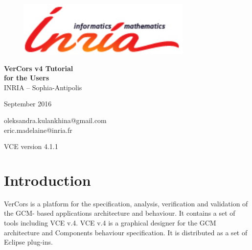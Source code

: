 \documentclass[12pt]{article}
\begin{document}
\begin{titlepage}

\begin{figure}[t]
    \centering
    \includegraphics[scale=0.4]{./draws/inria-logo.png}
\end{figure}

\vspace*{2cm}
\begin{center}
	{\huge \textbf{VerCors v4 Tutorial }} \vspace*{0.5cm}
\\
{\huge \textbf{for the Users }} \vspace*{1cm}
\\
    {\large INRIA – Sophia-Antipolis } \medskip \\
\end{center}

%
\vfill
\begin{center}
\begin{minipage}[b]{0.5\textwidth}
    \vspace*{1.3cm}
    \begin{center}
        {\large September 2016}
    \end{center}
        \begin{center}
        {\large oleksandra.kulankhina@gmail.com \\
        \large eric.madelaine@inria.fr}
    \end{center}
     \vspace*{1cm}
        \begin{center}
        {\large VCE version 4.1.1}
    \end{center}
\end{minipage}%
\end{center}

\thispagestyle{empty}

\end{titlepage}

\tableofcontents
\newpage

\section{Introduction}\label{sec:intro}
VerCors is a platform for the specification, analysis, verification and validation of the GCM-
based applications architecture and behaviour. It contains a set of tools including VCE v.4. VCE v.4 is a graphical designer for the GCM architecture and Components behaviour specification. It is distributed as a set of Eclipse plug-ins.
\end{document}

